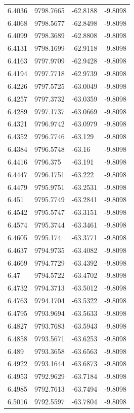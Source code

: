 \begin{table}[H]
\begin{tabular}{llll}
6.4036 & 9798.7665 & -62.8188 & -9.8098 \\
6.4068 & 9798.5677 & -62.8498 & -9.8098 \\
6.4099 & 9798.3689 & -62.8808 & -9.8098 \\
6.4131 & 9798.1699 & -62.9118 & -9.8098 \\
6.4163 & 9797.9709 & -62.9428 & -9.8098 \\
6.4194 & 9797.7718 & -62.9739 & -9.8098 \\
6.4226 & 9797.5725 & -63.0049 & -9.8098 \\
6.4257 & 9797.3732 & -63.0359 & -9.8098 \\
6.4289 & 9797.1737 & -63.0669 & -9.8098 \\
6.4321 & 9796.9742 & -63.0979 & -9.8098 \\
6.4352 & 9796.7746 & -63.129 & -9.8098 \\
6.4384 & 9796.5748 & -63.16 & -9.8098 \\
6.4416 & 9796.375 & -63.191 & -9.8098 \\
6.4447 & 9796.1751 & -63.222 & -9.8098 \\
6.4479 & 9795.9751 & -63.2531 & -9.8098 \\
6.451 & 9795.7749 & -63.2841 & -9.8098 \\
6.4542 & 9795.5747 & -63.3151 & -9.8098 \\
6.4574 & 9795.3744 & -63.3461 & -9.8098 \\
6.4605 & 9795.174 & -63.3771 & -9.8098 \\
6.4637 & 9794.9735 & -63.4082 & -9.8098 \\
6.4669 & 9794.7729 & -63.4392 & -9.8098 \\
6.47 & 9794.5722 & -63.4702 & -9.8098 \\
6.4732 & 9794.3713 & -63.5012 & -9.8098 \\
6.4763 & 9794.1704 & -63.5322 & -9.8098 \\
6.4795 & 9793.9694 & -63.5633 & -9.8098 \\
6.4827 & 9793.7683 & -63.5943 & -9.8098 \\
6.4858 & 9793.5671 & -63.6253 & -9.8098 \\
6.489 & 9793.3658 & -63.6563 & -9.8098 \\
6.4922 & 9793.1644 & -63.6873 & -9.8098 \\
6.4953 & 9792.9629 & -63.7184 & -9.8098 \\
6.4985 & 9792.7613 & -63.7494 & -9.8098 \\
6.5016 & 9792.5597 & -63.7804 & -9.8098 \\

\end{tabular}
\end{table}
